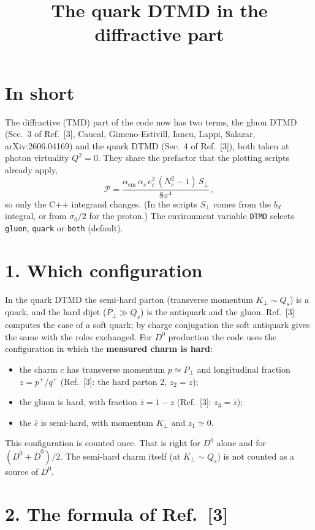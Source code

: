 \documentclass[12pt]{article}
\title{The quark DTMD in the diffractive part}
\author{}
\date{}
\begin{document}
\maketitle

\section*{In short}

The diffractive (TMD) part of the code now has two terms, the gluon DTMD (Sec.~3 of Ref.~[3],
Caucal, Gimeno-Estivill, Iancu, Lappi, Salazar, arXiv:2606.04169) and the quark DTMD (Sec.~4 of
Ref.~[3]), both taken at photon virtuality $Q^2=0$. They share the prefactor that the plotting scripts
already apply,
\[
  \mathcal{P}=\frac{\alpha_{\mathrm{em}}\,\alpha_s\,e_c^2\,(N_c^2-1)\,S_\perp}{8\pi^4}\,,
\]
so only the C++ integrand changes. (In the scripts $S_\perp$ comes from the $b_d$ integral, or from
$\sigma_0/2$ for the proton.) The environment variable \texttt{DTMD} selects \texttt{gluon},
\texttt{quark} or \texttt{both} (default).

\section*{1. Which configuration}

In the quark DTMD the semi-hard parton (transverse momentum $K_\perp\sim Q_s$) is a quark, and the
hard dijet ($P_\perp\gg Q_s$) is the antiquark and the gluon. Ref.~[3] computes the case of a soft quark;
by charge conjugation the soft antiquark gives the same with the roles exchanged. For $D^0$ production
the code uses the configuration in which the \textbf{measured charm is hard}:
\begin{itemize}
\item the charm $c$ has transverse momentum $p\simeq P_\perp$ and longitudinal fraction $z=p^+/q^+$
  (Ref.~[3]: the hard parton 2, $z_2=z$);
\item the gluon is hard, with fraction $\bar z=1-z$ (Ref.~[3]: $z_3=\bar z$);
\item the $\bar c$ is semi-hard, with momentum $K_\perp$ and $z_1\simeq0$.
\end{itemize}
This configuration is counted once. That is right for $D^0$ alone and for $(D^0+\bar D^0)/2$. The
semi-hard charm itself (at $K_\perp\sim Q_s$) is not counted as a source of $D^0$.

\section*{2. The formula of Ref.~[3]}
\end{document}
